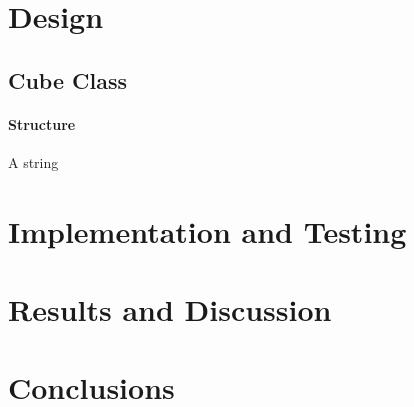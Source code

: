 \documentclass{report}
\begin{document}
    \newpage
    \chapter{Design}
    \section{Cube Class}
    \subsubsection{Structure}
    A string 
    
    \newpage
    \chapter{Implementation and Testing}
    
    \newpage
    \chapter{Results and Discussion}
    
    \newpage
    \chapter{Conclusions}
    
    
    
    \begin{appendix}
    	\newpage  
    	\listoffigures
    	\listoftables
    	\newpage
    	
    	
    \end{appendix}
    
\end{document}
